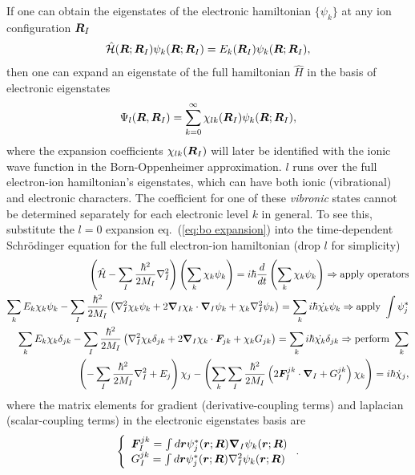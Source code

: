 If one can obtain the eigenstates of the electronic hamiltonian $\{\psi_k\}$ at any ion configuration $\boldsymbol{R}_I$
\begin{align}
\hat{\mathcal{H}} (\boldsymbol{R};\boldsymbol{R}_I) \psi_k(\boldsymbol{R};\boldsymbol{R}_I) = E_k(\boldsymbol{R}_I) \psi_k(\boldsymbol{R};\boldsymbol{R}_I),
\end{align}
then one can expand an eigenstate of the full hamiltonian $\hat{H}$ in the basis of electronic eigenstates
\begin{align} \label{eq:bo expansion}
\Psi_l(\boldsymbol{R},\boldsymbol{R}_I) = \sum_{k=0}^\infty \chi_{lk}(\boldsymbol{R}_I)\psi_k(\boldsymbol{R};\boldsymbol{R}_I), 
\end{align}
where the expansion coefficients $\chi_{lk}(\boldsymbol{R}_I)$ will later be identified with the ionic wave function in the Born-Oppenheimer approximation. $l$ runs over the full electron-ion hamiltonian's eigenstates, which can have both ionic (vibrational) and electronic characters. The coefficient for one of these \textit{vibronic} states cannot be determined separately for each electronic level $k$ in general. To see this, substitute the $l=0$ expansion eq.~(\ref{eq:bo expansion}) into the time-dependent Schr\"odinger equation for the full electron-ion hamiltonian (drop $l$ for simplicity)
\begin{align}
\left(\hat{\mathcal{H}} - \sum_I\frac{\hbar^2}{2M_I}\nabla_I^2\right)\left(\sum_k\chi_k\psi_k\right) = i\hbar\frac{d}{dt}\left(\sum_k\chi_k\psi_k\right) \nonumber \Rightarrow \text{apply operators} \\
\sum_k E_k\chi_k\psi_k-\sum_I\frac{\hbar^2}{2M_I}\left(\nabla^2_I\chi_k\psi_k+2\boldsymbol{\nabla}_I\chi_k\cdot\boldsymbol{\nabla}_I\psi_k+\chi_k\nabla_I^2\psi_k\right) = \sum_k i\hbar\dot{\chi_k}\psi_k \nonumber \Rightarrow \text{apply }\int\psi_j^* \\
\sum_k E_k\chi_k\delta_{jk}-\sum_I\frac{\hbar^2}{2M_I}\left(\nabla^2_I\chi_k\delta_{jk}+2\boldsymbol{\nabla}_I\chi_k\cdot\boldsymbol{F}_{jk}+\chi_kG_{jk}\right) = \sum_k i\hbar\dot{\chi_k}\delta_{jk} \nonumber \Rightarrow \text{perform }\sum_k \\
\left(-\sum_I\frac{\hbar^2}{2M_I}\nabla^2_I+E_j\right)\chi_j - \left(\sum_k\sum_I \frac{\hbar^2}{2M_I}\left(2\boldsymbol{F}_I^{jk}\cdot\boldsymbol{\nabla}_I+G_I^{jk}\right)\chi_k\right) = i\hbar\dot{\chi}_j, \label{eq:intro-boa-coupled}
\end{align}
where the matrix elements for gradient (derivative-coupling terms) and laplacian (scalar-coupling terms) in the electronic eigenstates basis are
\begin{align}
\left\{\begin{array}{l}
\boldsymbol{F}^{jk}_I = \int d\boldsymbol{r} \psi_j^*(\boldsymbol{r};\boldsymbol{R}) \boldsymbol{\nabla}_I\psi_k(\boldsymbol{r};\boldsymbol{R}) \\
G_I^{jk} = \int d\boldsymbol{r} \psi_j^*(\boldsymbol{r};\boldsymbol{R}) \nabla_I^2 \psi_k(\boldsymbol{r};\boldsymbol{R})
\end{array}\right..
\end{align}
